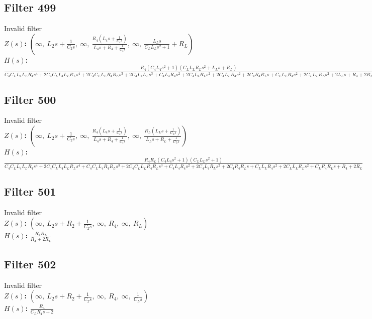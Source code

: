 \documentclass{article}
\begin{document}
\subsection*{Filter 499}
Invalid filter \\ 
\textbf{$Z(s)$:} $\left( \infty, \  L_{2} s + \frac{1}{C_{2} s}, \  \infty, \  \frac{R_{4} \left(L_{4} s + \frac{1}{C_{4} s}\right)}{L_{4} s + R_{4} + \frac{1}{C_{4} s}}, \  \infty, \  \frac{L_{L} s}{C_{L} L_{L} s^{2} + 1} + R_{L}\right)$ \\ 
\textbf{$H(s)$:} $\frac{R_{4} \left(C_{4} L_{4} s^{2} + 1\right) \left(C_{L} L_{L} R_{L} s^{2} + L_{L} s + R_{L}\right)}{C_{4} C_{L} L_{4} L_{L} R_{4} s^{4} + 2 C_{4} C_{L} L_{4} L_{L} R_{L} s^{4} + 2 C_{4} C_{L} L_{L} R_{4} R_{L} s^{3} + 2 C_{4} L_{4} L_{L} s^{3} + C_{4} L_{4} R_{4} s^{2} + 2 C_{4} L_{4} R_{L} s^{2} + 2 C_{4} L_{L} R_{4} s^{2} + 2 C_{4} R_{4} R_{L} s + C_{L} L_{L} R_{4} s^{2} + 2 C_{L} L_{L} R_{L} s^{2} + 2 L_{L} s + R_{4} + 2 R_{L}}$ \\ 
\subsection*{Filter 500}
Invalid filter \\ 
\textbf{$Z(s)$:} $\left( \infty, \  L_{2} s + \frac{1}{C_{2} s}, \  \infty, \  \frac{R_{4} \left(L_{4} s + \frac{1}{C_{4} s}\right)}{L_{4} s + R_{4} + \frac{1}{C_{4} s}}, \  \infty, \  \frac{R_{L} \left(L_{L} s + \frac{1}{C_{L} s}\right)}{L_{L} s + R_{L} + \frac{1}{C_{L} s}}\right)$ \\ 
\textbf{$H(s)$:} $\frac{R_{4} R_{L} \left(C_{4} L_{4} s^{2} + 1\right) \left(C_{L} L_{L} s^{2} + 1\right)}{C_{4} C_{L} L_{4} L_{L} R_{4} s^{4} + 2 C_{4} C_{L} L_{4} L_{L} R_{L} s^{4} + C_{4} C_{L} L_{4} R_{4} R_{L} s^{3} + 2 C_{4} C_{L} L_{L} R_{4} R_{L} s^{3} + C_{4} L_{4} R_{4} s^{2} + 2 C_{4} L_{4} R_{L} s^{2} + 2 C_{4} R_{4} R_{L} s + C_{L} L_{L} R_{4} s^{2} + 2 C_{L} L_{L} R_{L} s^{2} + C_{L} R_{4} R_{L} s + R_{4} + 2 R_{L}}$ \\ 
\subsection*{Filter 501}
Invalid filter \\ 
\textbf{$Z(s)$:} $\left( \infty, \  L_{2} s + R_{2} + \frac{1}{C_{2} s}, \  \infty, \  R_{4}, \  \infty, \  R_{L}\right)$ \\ 
\textbf{$H(s)$:} $\frac{R_{4} R_{L}}{R_{4} + 2 R_{L}}$ \\ 
\subsection*{Filter 502}
Invalid filter \\ 
\textbf{$Z(s)$:} $\left( \infty, \  L_{2} s + R_{2} + \frac{1}{C_{2} s}, \  \infty, \  R_{4}, \  \infty, \  \frac{1}{C_{L} s}\right)$ \\ 
\textbf{$H(s)$:} $\frac{R_{4}}{C_{L} R_{4} s + 2}$ \\ 
\end{document}
